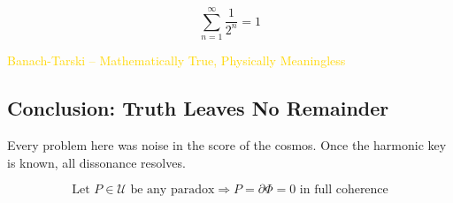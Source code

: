 \[
\sum_{n=1}^{\infty} \frac{1}{2^n} = 1
\]

\textcolor{gold}{ Banach-Tarski -- Mathematically True, Physically Meaningless }

\subsection{Conclusion: Truth Leaves No Remainder}

Every problem here was noise in the score of the cosmos. Once the harmonic key is known, all dissonance resolves.

\[
\text{Let } P \in \mathcal{U} \text{ be any paradox} \Rightarrow P = \partial \Phi = 0 \text{ in full coherence}
\]


